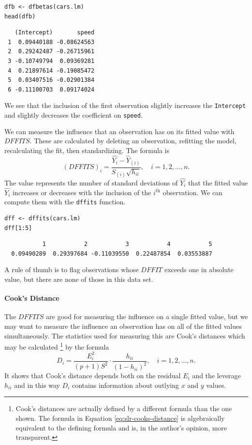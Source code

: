\documentclass[captions=tableheading]{scrbook}
\begin{document}
\begin{verbatim}
dfb <- dfbetas(cars.lm)
head(dfb)
\end{verbatim}

\begin{verbatim}
   (Intercept)       speed
 1  0.09440188 -0.08624563
 2  0.29242487 -0.26715961
 3 -0.10749794  0.09369281
 4  0.21897614 -0.19085472
 5  0.03407516 -0.02901384
 6 -0.11100703  0.09174024
\end{verbatim}

We see that the inclusion of the first observation slightly increases the \texttt{Intercept} and slightly decreases the coefficient on \texttt{speed}.

We can measure the influence that an observation has on its fitted value with \(DFFITS\). These are calculated by deleting an observation, refitting the model, recalculating the fit, then standardizing. The formula is 
\begin{equation}
(DFFITS)_{i}=\frac{\hat{Y_{i}}-\hat{Y}_{(i)}}{S_{(i)}\sqrt{h_{ii}}},\quad i=1,2,\ldots,n.
\end{equation}
The value represents the number of standard deviations of \(\hat{Y_{i}}\) that the fitted value \(\hat{Y_{i}}\) increases or decreases with the inclusion of the \(i^{\textrm{th}}\) observation. We can compute them with the \texttt{dffits} function.


\begin{verbatim}
dff <- dffits(cars.lm)
dff[1:5]
\end{verbatim}

\begin{verbatim}
           1           2           3           4           5 
  0.09490289  0.29397684 -0.11039550  0.22487854  0.03553887
\end{verbatim}

A rule of thumb is to flag observations whose \(DFFIT\) exceeds one in absolute value, but there are none of those in this data set.

\paragraph*{Cook's Distance}

The \(DFFITS\) are good for measuring the influence on a single fitted value, but we may want to measure the influence an observation has on all of the fitted values simultaneously. The statistics used for measuring this are Cook's distances which may be calculated
\footnote{Cook's distances are actually defined by a different formula than the one shown. The formula in Equation \ref{eq:slr-cooks-distance} is algebraically equivalent to the defining formula and is, in the author's opinion, more transparent.}
by the formula
\begin{equation}
D_{i}=\frac{E_{i}^{2}}{(p+1)S^{2}}\cdot\frac{h_{ii}}{(1-h_{ii})^{2}},\quad i=1,2,\ldots,n.\label{eq:slr-cooks-distance}
\end{equation}
It shows that Cook's distance depends both on the residual \(E_{i}\) and the leverage \(h_{ii}\) and in this way \(D_{i}\) contains information about outlying \(x\) and \(y\) values.
\end{document}
